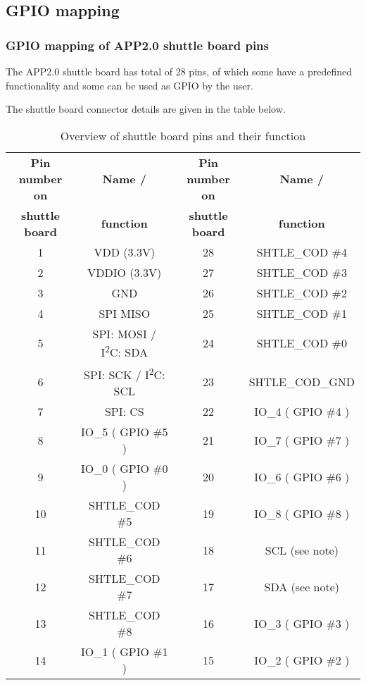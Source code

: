 \documentclass{article}
\begin{document}
\subsection{GPIO mapping}

\subsubsection{GPIO mapping of APP2.0 shuttle board pins}

The APP2.0 shuttle board has total of 28 pins, of which some have a predefined functionality and some can be used as GPIO by the user.

The shuttle board connector details are given in the table below.

\begin{table}[H]
	\centering
	\begin{tabular}{|c|c|c|c|}
		\hline
		\textbf{Pin number on} & \textbf{Name /} & \textbf{Pin number on} & \textbf{Name /} \\
		\textbf{shuttle board} & \textbf{function} & \textbf{shuttle board} & \textbf{function} \\
		\hline\hline
		1 & VDD (3.3V) & 28 & SHTLE\_COD \#4 \\ \hline
		2 & VDDIO (3.3V) & 27 & SHTLE\_COD \#3 \\ \hline
		3 & GND & 26 & SHTLE\_COD \#2 \\ \hline
		4 & SPI MISO & 25 & SHTLE\_COD \#1 \\ \hline
		5 & SPI: MOSI / I\textsuperscript{2}C: SDA & 24 & SHTLE\_COD \#0 \\ \hline
		6 & SPI: SCK / I\textsuperscript{2}C: SCL & 23 & SHTLE\_COD\_GND \\ \hline
		7 & SPI: CS & 22 & IO\_4 ( GPIO \#4 ) \\ \hline
		8 & IO\_5 ( GPIO \#5 ) & 21 & IO\_7 ( GPIO \#7 ) \\ \hline
		9 & IO\_0 ( GPIO \#0 ) & 20 & IO\_6 ( GPIO \#6 ) \\ \hline 
		10 & SHTLE\_COD \#5 & 19 & IO\_8 ( GPIO \#8 ) \\ \hline 
		11 & SHTLE\_COD \#6 & 18 & SCL (see note) \\ \hline 
		12 & SHTLE\_COD \#7 & 17 & SDA (see note)\\ \hline 
		13 & SHTLE\_COD \#8 & 16 & IO\_3 ( GPIO \#3 ) \\ \hline
		14 & IO\_1 ( GPIO \#1 ) & 15 & IO\_2 ( GPIO \#2 ) \\ \hline
	\end{tabular}
	\caption{Overview of shuttle board pins and their function}
	\label{tab:shtbrdpins}
\end{table}
\end{document}
